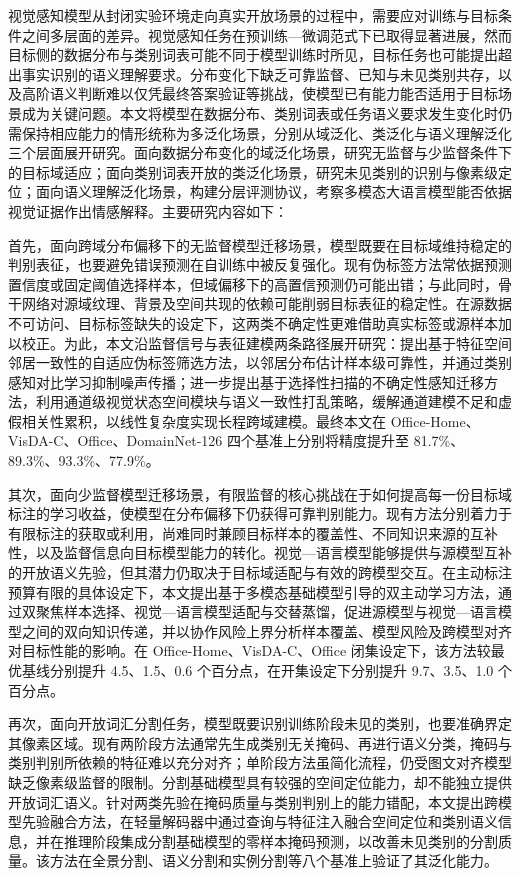 \begin{cabstract}

视觉感知模型从封闭实验环境走向真实开放场景的过程中，需要应对训练与目标条件之间多层面的差异。视觉感知任务在预训练—微调范式下已取得显著进展，然而目标侧的数据分布与类别词表可能不同于模型训练时所见，目标任务也可能提出超出事实识别的语义理解要求。分布变化下缺乏可靠监督、已知与未见类别共存，以及高阶语义判断难以仅凭最终答案验证等挑战，使模型已有能力能否适用于目标场景成为关键问题。本文将模型在数据分布、类别词表或任务语义要求发生变化时仍需保持相应能力的情形统称为多泛化场景，分别从域泛化、类泛化与语义理解泛化三个层面展开研究。面向数据分布变化的域泛化场景，研究无监督与少监督条件下的目标域适应；面向类别词表开放的类泛化场景，研究未见类别的识别与像素级定位；面向语义理解泛化场景，构建分层评测协议，考察多模态大语言模型能否依据视觉证据作出情感解释。主要研究内容如下：

首先，面向跨域分布偏移下的无监督模型迁移场景，模型既要在目标域维持稳定的判别表征，也要避免错误预测在自训练中被反复强化。现有伪标签方法常依据预测置信度或固定阈值选择样本，但域偏移下的高置信预测仍可能出错；与此同时，骨干网络对源域纹理、背景及空间共现的依赖可能削弱目标表征的稳定性。在源数据不可访问、目标标签缺失的设定下，这两类不确定性更难借助真实标签或源样本加以校正。为此，本文沿监督信号与表征建模两条路径展开研究：提出基于特征空间邻居一致性的自适应伪标签筛选方法，以邻居分布估计样本级可靠性，并通过类别感知对比学习抑制噪声传播；进一步提出基于选择性扫描的不确定性感知迁移方法，利用通道级视觉状态空间模块与语义一致性打乱策略，缓解通道建模不足和虚假相关性累积，以线性复杂度实现长程跨域建模。最终本文在 Office-Home、VisDA-C、Office、DomainNet-126 四个基准上分别将精度提升至 81.7\%、89.3\%、93.3\%、77.9\%。

其次，面向少监督模型迁移场景，有限监督的核心挑战在于如何提高每一份目标域标注的学习收益，使模型在分布偏移下仍获得可靠判别能力。现有方法分别着力于有限标注的获取或利用，尚难同时兼顾目标样本的覆盖性、不同知识来源的互补性，以及监督信息向目标模型能力的转化。视觉—语言模型能够提供与源模型互补的开放语义先验，但其潜力仍取决于目标域适配与有效的跨模型交互。在主动标注预算有限的具体设定下，本文提出基于多模态基础模型引导的双主动学习方法，通过双聚焦样本选择、视觉—语言模型适配与交替蒸馏，促进源模型与视觉—语言模型之间的双向知识传递，并以协作风险上界分析样本覆盖、模型风险及跨模型对齐对目标性能的影响。在 Office-Home、VisDA-C、Office 闭集设定下，该方法较最优基线分别提升 4.5、1.5、0.6 个百分点，在开集设定下分别提升 9.7、3.5、1.0 个百分点。

再次，面向开放词汇分割任务，模型既要识别训练阶段未见的类别，也要准确界定其像素区域。现有两阶段方法通常先生成类别无关掩码、再进行语义分类，掩码与类别判别所依赖的特征难以充分对齐；单阶段方法虽简化流程，仍受图文对齐模型缺乏像素级监督的限制。分割基础模型具有较强的空间定位能力，却不能独立提供开放词汇语义。针对两类先验在掩码质量与类别判别上的能力错配，本文提出跨模型先验融合方法，在轻量解码器中通过查询与特征注入融合空间定位和类别语义信息，并在推理阶段集成分割基础模型的零样本掩码预测，以改善未见类别的分割质量。该方法在全景分割、语义分割和实例分割等八个基准上验证了其泛化能力。


\end{cabstract}
